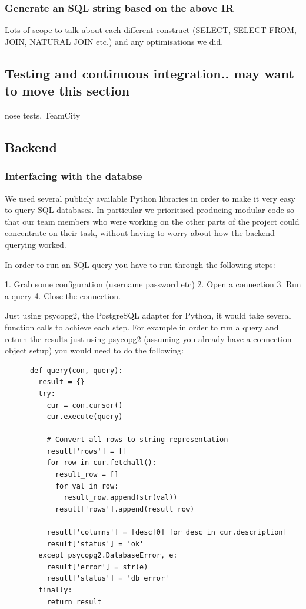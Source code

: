 \documentclass[a4paper, 11pt]{article}
\begin{document}
    \subsubsection{Generate an SQL string based on the above IR}
      Lots of scope to talk about each different construct (SELECT, SELECT FROM, JOIN, NATURAL JOIN etc.) and any optimisations we did.

  \subsection{Testing and continuous integration.. may want to move this section}
    nose tests, TeamCity
    \subsection{Backend}
     \subsubsection{Interfacing with the databse}

      We used several publicly available Python libraries in order to make 
      it very easy to query SQL databases. In particular we prioritised
      producing modular code so that our team members who were working on the
      other parts of the project could concentrate on their task, without having
      to worry about how the backend querying worked.

      In order to run an SQL query you have to run through the following steps:

      1. Grab some configuration (username password etc)
      2. Open a connection
      3. Run a query
      4. Close the connection.

      Just using psycopg2, the PostgreSQL adapter for Python, it would take
      several function calls to achieve each step. For example in order to run a
      query and return the results just using psycopg2 (assuming you already
      have a connection object setup) you would need to do the following:
      
     
      \begin{verbatim}
      def query(con, query):
        result = {}
        try:
          cur = con.cursor()
          cur.execute(query)

          # Convert all rows to string representation
          result['rows'] = []
          for row in cur.fetchall():
            result_row = []
            for val in row:
              result_row.append(str(val))
            result['rows'].append(result_row)

          result['columns'] = [desc[0] for desc in cur.description]
          result['status'] = 'ok'
        except psycopg2.DatabaseError, e:
          result['error'] = str(e)
          result['status'] = 'db_error'
        finally:
          return result
      \end{verbatim}
\end{document}
